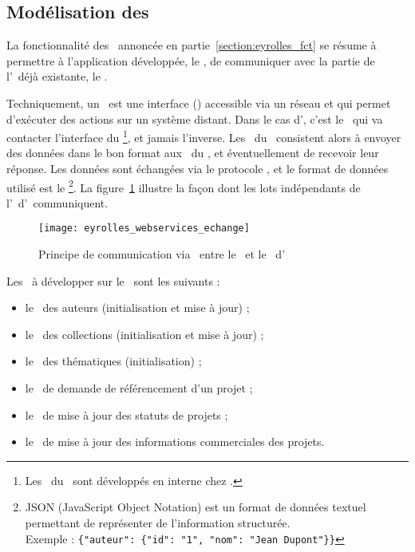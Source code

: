 \subsection{Modélisation des \awss}
\label{section:eyrolles_webservices}

La fonctionnalité des \awss\ annoncée en partie~\ref{section:eyrolles_fct} se résume à permettre à l'application développée, le \alotdeux, de communiquer avec la partie de l'\aintranet\ déjà existante, le \alotun.

Techniquement, un \aws\ est une interface (\aapi) accessible via un réseau et qui permet d'exécuter des actions sur un système distant. Dans le cas d'\aey, c'est le \alotdeux\ qui va contacter l'interface du \alotun\footnote{Les \awss\ du \alotun\ sont développés en interne chez \aey.}, et jamais l'inverse. Les \awss\ du \alotdeux\ consistent alors à envoyer des données dans le bon format aux \awss\ du \alotun, et éventuellement de recevoir leur réponse. Les données sont échangées via le protocole \ahttp, et le format de données utilisé est le \ajson\footnote{JSON (JavaScript Object Notation) est un format de données textuel permettant de représenter de l'information structurée.\\Exemple : \texttt{\{"auteur": \{"id": "1", "nom": "Jean Dupont"\}\}}}. La figure~\ref{figure:eyrolles_webservices_echange} illustre la façon dont les lots indépendants de l'\aintranet\ d'\aey\ communiquent.

\begin{figure}
	\centering
	\texttt{[image: eyrolles\_webservices\_echange]}
	\caption{Principe de communication via \aws\ entre le \alotun\ et le \alotdeux\ d'\aey}
	\label{figure:eyrolles_webservices_echange}
\end{figure}

Les \awss\ à développer sur le \alotdeux\ sont les suivants :

\begin{itemize}
	\item le \aws\ des auteurs (initialisation et mise à jour) ;
	\item le \aws\ des collections (initialisation et mise à jour) ;
	\item le \aws\ des thématiques (initialisation) ;
	\item le \aws\ de demande de référencement d'un projet ;
	\item le \aws\ de mise à jour des statuts de projets ;
	\item le \aws\ de mise à jour des informations commerciales des projets.
\end{itemize}


